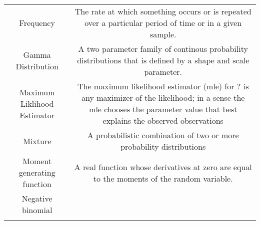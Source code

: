 \documentclass[]{book}
\theoremstyle{definition}
\theoremstyle{definition}
\theoremstyle{definition}
\theoremstyle{remark}
\begin{document}
\begin{longtable}[]{@{}cc@{}}
\begin{minipage}[t]{0.43\columnwidth}
Frequency\strut
\end{minipage} & \begin{minipage}[t]{0.43\columnwidth}\centering\strut
The rate at which something occurs or is repeated over a particular
period of time or in a given sample.\strut
\end{minipage}\tabularnewline
\begin{minipage}[t]{0.43\columnwidth}\centering\strut
Gamma Distribution\strut
\end{minipage} & \begin{minipage}[t]{0.43\columnwidth}\centering\strut
A two parameter family of continous probability distributions that is
defined by a shape and scale parameter.\strut
\end{minipage}\tabularnewline
\begin{minipage}[t]{0.43\columnwidth}\centering\strut
Maximum Liklihood Estimator\strut
\end{minipage} & \begin{minipage}[t]{0.43\columnwidth}\centering\strut
The maximum likelihood estimator (mle) for ? is any maximizer of the
likelihood; in a sense the mle chooses the parameter value that best
explains the observed observations\strut
\end{minipage}\tabularnewline
\begin{minipage}[t]{0.43\columnwidth}\centering\strut
Mixture\strut
\end{minipage} & \begin{minipage}[t]{0.43\columnwidth}\centering\strut
A probabilistic combination of two or more probability
distributions\strut
\end{minipage}\tabularnewline
\begin{minipage}[t]{0.43\columnwidth}\centering\strut
Moment generating function\strut
\end{minipage} & \begin{minipage}[t]{0.43\columnwidth}\centering\strut
A real function whose derivatives at zero are equal to the moments of
the random variable.\strut
\end{minipage}\tabularnewline
\begin{minipage}[t]{0.43\columnwidth}\centering\strut
Negative binomial\strut
\end{minipage} & \begin{minipage}[t]{0.43\columnwidth}\centering\strut
\strut
\end{minipage}\tabularnewline
\begin{minipage}[t]{0.43\columnwidth}\centering\strut

\end{minipage}
\end{longtable}
\end{document}
